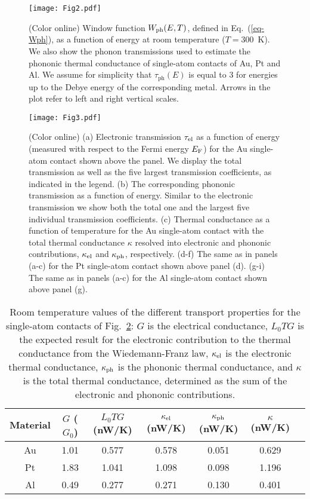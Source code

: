 \documentclass[aps,amsmath,amssymb,twocolumn,showpacs]{revtex4-1}
\begin{document}
%
\begin{figure}[t]
\begin{center} \texttt{[image: Fig2.pdf]} \end{center}
\caption{(Color online) Window function $W_{\rm ph}(E,T)$, defined in 
  Eq.~(\ref{eq-Wph}), as a function of energy at room temperature ($T=300$~K). 
  We also show the phonon transmissions used to estimate
  the phononic thermal conductance of single-atom contacts of Au, Pt and
  Al. We assume for simplicity that $\tau_{\text{ph}}(E)$ is equal to 3 for
  energies up to the Debye energy of the corresponding metal. Arrows in the 
  plot refer to left and right vertical scales.}
\label{fig-estimate}
\end{figure}
%

%
\begin{figure*}[t]
\texttt{[image: Fig3.pdf]}
\caption{(Color online) (a) Electronic transmission $\tau_{\rm el}$ as a
  function of energy (measured with respect to the Fermi energy $E_{\rm F}$)
  for the Au single-atom contact shown above the panel. We display the total
  transmission as well as the five largest transmission coefficients, as
  indicated in the legend. (b) The corresponding phononic transmission as a
  function of energy. Similar to the electronic transmission we show both the
  total one and the largest five individual transmission coefficients. (c)
  Thermal conductance as a function of temperature for the Au single-atom
  contact with the total thermal conductance $\kappa$ resolved into electronic
  and phononic contributions, $\kappa_{\rm el}$ and $\kappa_{\rm ph}$,
  respectively. (d-f) The same as in panels (a-c) for the Pt single-atom
  contact shown above panel (d). (g-i) The same as in panels
  (a-c) for the Al single-atom contact shown above panel (g).}
\label{fig-one-atom}
\end{figure*}
%

%
\begin{table*}[t]
\caption{\label{table1} Room temperature values of the different transport
  properties for the single-atom contacts of Fig.~\ref{fig-one-atom}: $G$ is
  the electrical conductance, $L_0TG$ is the expected result for the
  electronic contribution to the thermal conductance from the Wiedemann-Franz
  law, $\kappa_{\rm el}$ is the electronic thermal conductance, $\kappa_{\rm
    ph}$ is the phononic thermal conductance, and $\kappa$ is the total
  thermal conductance, determined as the sum of the electronic and phononic
  contributions.}
\begin{tabular}{ccccccc}
Material \; & \; $G$ ($G_0$) \; & \; $L_0TG$ (nW/K) \; & \; $\kappa_{\rm el}$ (nW/K) \; & 
\; $\kappa_{\rm ph}$ (nW/K) \; & \; $\kappa$ (nW/K) \; \\ \hline
Au & 1.01  & 0.577 & 0.578 & 0.051 & 0.629 \\
Pt & 1.83  & 1.041 & 1.098 & 0.098 & 1.196 \\
Al & 0.49  & 0.277 & 0.271 & 0.130 & 0.401 \\ \hline
\end{tabular}
\end{table*}
%
\end{document}
